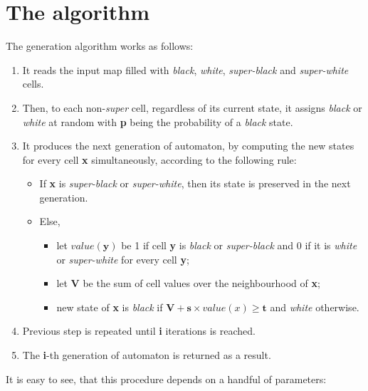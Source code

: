\documentclass[a4paper, 11pt]{article} %
\begin{document}

\section*{The algorithm}

The generation algorithm works as follows:

\begin{enumerate}
	\item It reads the input map filled with \emph{black}, \emph{white}, \emph{super-black} and \emph{super-white} cells.
	\item Then, to each non-\emph{super} cell, regardless of its current state, it assigns \emph{black} or \emph{white} at random with \textbf{p} being the probability of a \emph{black} state.
	\item It produces the next generation of automaton, by computing the new states for every cell \textbf{x} simultaneously, according to the following rule:
		\begin{itemize}
			\item If \textbf{x} is \emph{super-black} or \emph{super-white}, then its state is preserved in the next generation.
			\item Else,
				\begin{itemize}
					\item let $value(\textbf{y})$ be 1 if cell \textbf{y} is \emph{black} or \emph{super-black} and 0 if it is \emph{white} or \emph{super-white} for every cell \textbf{y};
					\item let \textbf{V} be the sum of cell values over the neighbourhood of \textbf{x};
					\item new state of \textbf{x} is \emph{black} if $\textbf{V} + \textbf{s} \times value(x) \geq \textbf{t}$ and \emph{white} otherwise.
				\end{itemize}
		\end{itemize}
	\item Previous step is repeated until \textbf{i} iterations is reached.
	\item The \textbf{i}-th generation of automaton is returned as a result.
\end{enumerate}

It is easy to see, that this procedure depends on a handful of parameters:
\end{document}
